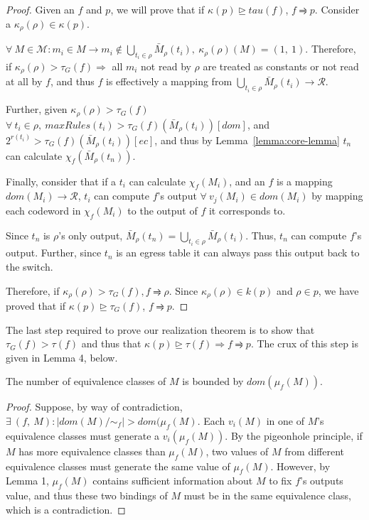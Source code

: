\begin{proof}
Given an $f$ and $p$, we will prove that if $\kappa(p)\trianglerighteq tau(f)$, $f \rightrightharpoons p$. Consider a $\kappa_\rho(\rho) \in \kappa(p)$.

$\forall\ M \in \mathcal{M} : m_i \in M \rightarrow m_i \notin \bigcup_{t_i \in \rho} \bar{M}_\rho(t_i),\ \kappa_\rho(\rho)(M) = (1,\ 1)$. Therefore, if $\kappa_\rho(\rho) > \tau_G(f) \Rightarrow$ all $m_i$ not read by $\rho$ are treated as constants or not read at all by $f$, and thus $f$ is effectively a mapping from $\bigcup_{t_i \in \rho} \bar{M}_\rho(t_i) \rightarrow \mathcal{R}$. 

Further, given $\kappa_\rho(\rho) > \tau_G(f)$ $\forall\ t_i \in \rho,\ maxRules(t_i) > \tau_G(f)(\bar{M}_\rho(t_i))[dom]$, and $2^{r(t_i)} > \tau_G(f)(\bar{M}_\rho(t_i))[ec]$, and thus by Lemma~\ref{lemma:core-lemma} $t_n$ can calculate $\chi_f(\bar{M}_\rho(t_n))$.

Finally, consider that if a $t_i$ can calculate $\chi_f(M_i)$, and an $f$ is a mapping $dom(M_i) \rightarrow \mathcal{R}$, $t_i$ can compute $f$'s output $\forall\ v_j(M_i) \in dom(M_i)$ by mapping each codeword in $\chi_f(M_i)$ to the output of $f$ it corresponds to.

Since $t_n$ is $\rho$'s only output, $\bar{M}_\rho(t_n) = \bigcup_{t_i \in \rho} \bar{M}_\rho(t_i)$. Thus, $t_n$ can compute $f$'s output. Further, since $t_n$ is an egress table it can always pass this output back to the switch.

Therefore, if $\kappa_\rho(\rho) > \tau_G(f), f \rightrightharpoons \rho$. Since $\kappa_\rho(\rho) \in k(p)$ and $\rho \in p$, we have proved that if $\kappa(p)\trianglerighteq \tau_G(f)$, $f \rightrightharpoons p$.
\end{proof}

The last step required to prove our realization theorem is to show that $\tau_G(f) > \tau(f)$ and thus that $\kappa(p)\trianglerighteq \tau(f) \Rightarrow f \rightrightharpoons p$. The crux of this step is given in Lemma 4, below.
 
\begin{lemma} The number of equivalence classes of $M$ is bounded by $dom(\mu_f(M))$.
\label{lemma:domM-domMu}
\end{lemma}

\begin{proof}
Suppose, by way of contradiction, $\exists\ (f,\ M) : |dom(M)/\sim_f| > dom(\mu_f(M)$. Each $v_i(M)$ in one of $M$'s equivalence classes must generate a $v_i(\mu_f(M))$. By the pigeonhole principle, if $M$ has more equivalence classes than $\mu_f(M)$, two values of $M$ from different equivalence classes must generate the same value of $\mu_f(M)$. However, by Lemma 1, $\mu_f(M)$ contains sufficient information about $M$ to fix $f$'s outputs value, and thus these two bindings of $M$ must be in the same equivalence class, which is a contradiction.
\end{proof}

